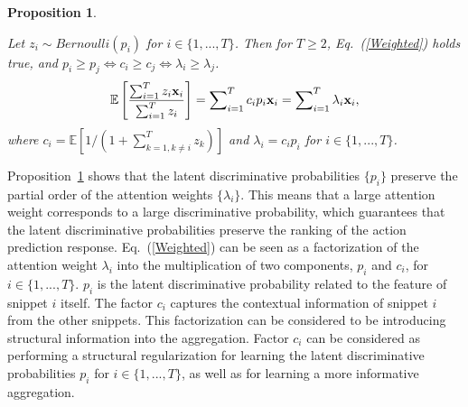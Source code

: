 \documentclass{article} \usepackage{iclr2019_conference,times}
\newtheorem{proposition}{Proposition}
\begin{document}
\begin{proposition}
\label{Reduce}

Let  $ z_{i} \sim Bernoulli(p_{i}) $  for $i \in \{1,...,T\}$. Then for $T \ge 2$, Eq.~(\ref{Weighted}) holds true, and ${p_i} \ge {p_j} \Leftrightarrow {c_i} \ge {c_j}  \Leftrightarrow {\lambda_i} \ge {\lambda_j}  $.  \begin{align}
\label{Weighted}
\mathbb{E}\left[ \frac{\sum\nolimits_{i = 1} ^T {{z_i}{{\bf{x}}_i}}}{\sum\nolimits_{i = 1}^T {{z_i}}} \right] =  \sum\nolimits_{i = 1} ^T {c_ip_i{\bf{x}}_i} = \sum\nolimits_{i =1}^{T}\lambda_{i}{\bf x}_i, \end{align}
where ${c_i} = \mathbb{E}\left[ {1/(1 + \sum\nolimits_{k = 1,k \ne i}^T {{z_k}} )} \right]$ and $\lambda_i = c_ip_i$ for $i \in \{1,...,T\}$.

\end{proposition}
Proposition~\ref{Reduce} shows that the latent discriminative probabilities $\{p_{i}\}$ preserve the partial order of the attention weights $\{\lambda_{i}\}$. This means that a large attention weight corresponds to a large discriminative probability, which guarantees that the latent discriminative probabilities preserve the ranking of the action prediction response.
Eq.~(\ref{Weighted}) can be seen as a factorization of the attention weight $\lambda_i$ into the multiplication of two components, $p_i$ and $c_i$, for $i  \in \{1,...,T\}$. $p_i$ is the latent discriminative probability related to the feature of snippet $ i $ itself. The factor $ c_i $ captures the contextual information of snippet $ i $ from the other snippets. This factorization can be considered to be introducing structural information into the aggregation. Factor $ c_{i} $ can be considered as performing a structural regularization for learning the latent discriminative probabilities $p_i$ for $i  \in \{1,...,T\}$, as well as for learning a more informative aggregation. 
\end{document}
